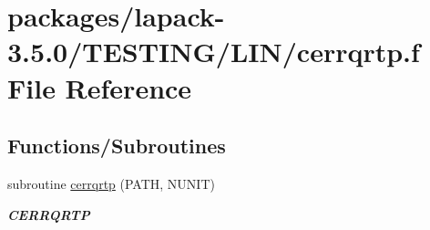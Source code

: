 \hypertarget{cerrqrtp_8f}{}\section{packages/lapack-\/3.5.0/\+T\+E\+S\+T\+I\+N\+G/\+L\+I\+N/cerrqrtp.f File Reference}
\label{cerrqrtp_8f}
\subsection*{Functions/\+Subroutines}
\begin{DoxyCompactItemize}
\item 
subroutine \hyperlink{group__complex__lin_ga8076764789437cf6ba0806ecb18f0a57}{cerrqrtp} (P\+A\+T\+H, N\+U\+N\+I\+T)
\begin{DoxyCompactList}\small\item\em {\bfseries C\+E\+R\+R\+Q\+R\+T\+P} \end{DoxyCompactList}\end{DoxyCompactItemize}
